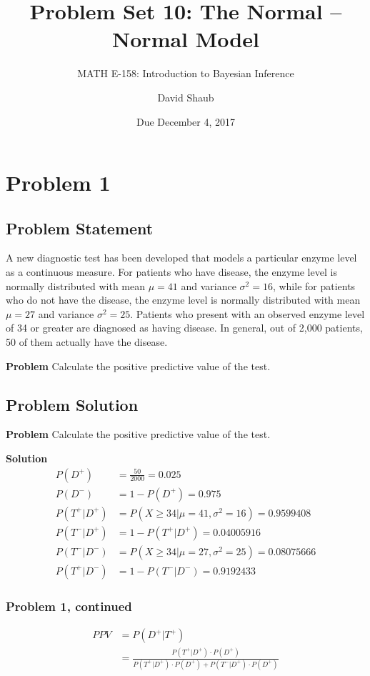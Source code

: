 \documentclass[12pt]{article}
\title{Problem Set 10: The Normal -- Normal Model}
\author{MATH E-158: Introduction to Bayesian Inference}
\author{David Shaub}
\date{Due December 4, 2017}
\theoremstyle{definition}
\begin{document}
	
	\maketitle


\section*{Problem 1}


\subsection*{Problem Statement}

A new diagnostic test has been developed that models a particular enzyme level as a continuous measure. For patients who have disease, the enzyme level is normally distributed with mean $\mu = 41$ and variance $\sigma^2 = 16$, while for patients who do not have the disease, the enzyme level is normally distributed with mean $\mu = 27$ and variance $\sigma^2 = 25$. Patients who present with an observed enzyme level of 34 or greater are diagnosed as having disease. In general, out of 2,000 patients, 50 of them actually have the disease.

\bigskip
\noindent
{\bf Problem} Calculate the positive predictive value of the test.



\subsection*{Problem Solution}

\noindent
{\bf Problem} Calculate the positive predictive value of the test.

\bigskip
\noindent
{\bf Solution} 
\begin{align*}
P(D^+) &= \frac{50}{2000} = 0.025\\
P(D^-) &= 1 - P(D^+) = 0.975\\
P(T^+|D^+) &= P(X \geq 34 | \mu = 41, \sigma^2 = 16) = 0.9599408\\
P(T^-|D^+) &= 1 - P(T^+|D^+) = 0.04005916\\
P(T^-|D^-) &= P(X \geq 34 | \mu = 27, \sigma^2 = 25) = 0.08075666\\
P(T^+|D^-) &= 1 - P(T^-|D^-) = 0.9192433
\end{align*}
\newpage
\subsubsection*{Problem 1, continued}
\begin{align*}
PPV &= P(D^+|T^+)\\
&= \frac{P(T^+|D^+)\cdot P(D^+)}{P(T^+|D^+)\cdot P(D^+) + P(T^-|D^+)\cdot P(D^+)}\\
\end{align*}
\end{document}
